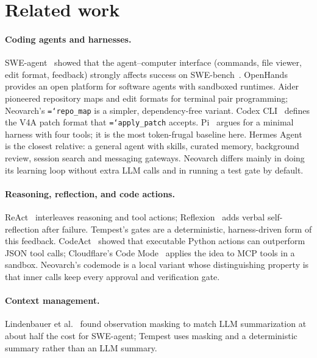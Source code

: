 \documentclass[11pt]{article}
\newcommand{\code}[1]{\texttt{\hyphenchar\font=`\-\relax #1}}
\begin{document}
\section{Related work}
\label{sec:related}

\paragraph{Coding agents and harnesses.} SWE-agent~\citep{yang2024sweagent} showed that the agent--computer interface (commands, file viewer, edit format, feedback) strongly affects success on SWE-bench~\citep{jimenez2024swebench}.
OpenHands~\citep{wang2025openhands} provides an open platform for software agents with sandboxed runtimes. Aider~\citep{aider} pioneered repository maps and edit formats for terminal pair programming; Neovarch's \code{repo\_map}
is a simpler, dependency-free variant. Codex CLI~\citep{codexcli} defines the V4A patch format that \code{apply\_patch} accepts. Pi~\citep{pi,zechner2025pi} argues for a minimal harness with four tools; it is the most token-frugal baseline here.
Hermes Agent~\citep{hermesagent} is the closest relative: a general agent with skills, curated memory, background review, session search and messaging gateways. Neovarch differs mainly in doing its learning loop without extra LLM calls and in running a test gate by default.

\paragraph{Reasoning, reflection, and code actions.} ReAct~\citep{yao2023react} interleaves reasoning and tool actions; Reflexion~\citep{shinn2023reflexion} adds verbal self-reflection after failure. Tempest's gates are a deterministic,
harness-driven form of this feedback. CodeAct~\citep{wang2024codeact} showed that executable Python actions can outperform JSON tool calls; Cloudflare's Code Mode~\citep{varda2025codemode} applies the idea to MCP tools in a sandbox. Neovarch's codemode is a local variant whose distinguishing property is that inner calls keep every approval and verification gate.

\paragraph{Context management.} Lindenbauer et al.~\citep{lindenbauer2025complexity} found observation masking to match LLM summarization at about half the cost for SWE-agent; Tempest uses masking and a deterministic summary rather than an LLM summary.
\end{document}
